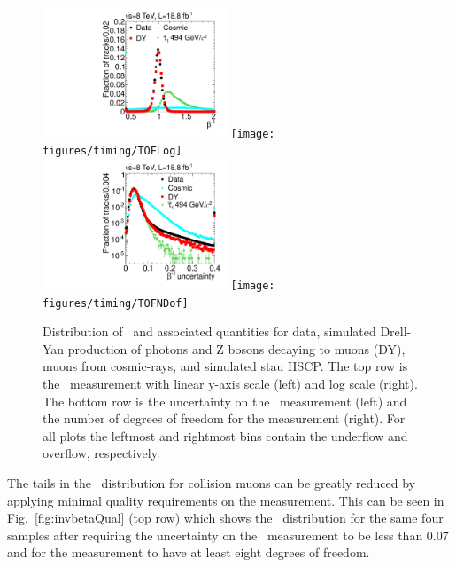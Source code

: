 \begin{figure}
  \begin{center}
      \includegraphics[width=0.49\textwidth]{figures/timing/TOF}
      \texttt{[image: figures/timing/TOFLog]} \\
      \includegraphics[width=0.49\textwidth]{figures/timing/TOFErr}
      \texttt{[image: figures/timing/TOFNDof]} \\
      \caption[Distribution of \invbeta\ and associated quantities.]
      {Distribution of \invbeta\ and associated quantities for data,
simulated Drell-Yan production of photons and Z bosons decaying to muons (DY), muons from cosmic-rays, and simulated stau HSCP.
The top row is the \invbeta\ measurement with linear y-axis scale (left) and log scale (right).
The bottom row is the uncertainty on the \invbeta\ measurement (left) and the number of degrees of freedom for the measurement (right).
For all plots the leftmost and rightmost bins contain the underflow and overflow, respectively.
        }
      \label{fig:invbeta}
  \end{center}
\end{figure}

The tails in the \invbeta\ distribution for collision muons can be greatly reduced by applying minimal quality requirements on the measurement.
This can be seen in Fig.~\ref{fig:invbetaQual} (top row) which shows the \invbeta\ distribution for the same
four samples after requiring the uncertainty on the \invbeta\ measurement
to be less than 0.07 and for the measurement to have at least eight degrees of freedom.

